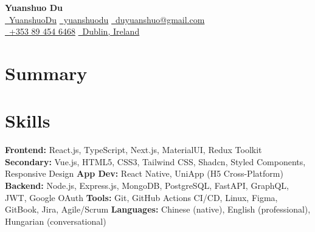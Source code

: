 \documentclass{simpleresume}
\begin{document}
\begin{center}
  {\Large\sffamily\bfseries\color{namecolor} Yuanshuo Du}\\[0.08cm]
  {\sffamily\small
    \href{https://github.com/YuanshuoDu}{\color{accent}\faGithub\color{muted}\ YuanshuoDu}
    \quad\textbullet\quad
    \href{https://linkedin.com/in/yuanshuodu}{\color{accent}\faLinkedin\color{muted}\ yuanshuodu}
    \quad\textbullet\quad
    \href{https://mail.google.com/mail/?view=cm&to=duyuanshuo@gmail.com}{\color{accent}\faEnvelope\color{muted}\ duyuanshuo@gmail.com}
  }\\[0.04cm]
  {\sffamily\small\color{muted}
    \href{tel:+353894546468}{\color{accent}\faPhone\color{muted}\ +353 89 454 6468}
    \quad\textbullet\quad
    \href{https://www.google.com/maps/place/Dublin,+Ireland}{\color{accent}\faMapMarker\ Dublin, Ireland}
  }
\end{center}
\headerrule

\section{Summary}
\vspace{-0.08cm}

\section{Skills}
\noindent
{\sffamily\small\color{secondary}
  \textbf{Frontend:} React.js, TypeScript, Next.js, MaterialUI, Redux Toolkit
  \newline
  \textbf{Secondary:} Vue.js, HTML5, CSS3, Tailwind CSS, Shadcn, Styled Components, Responsive Design
  \newline
  \textbf{App Dev:} React Native, UniApp (H5 Cross-Platform)
  \newline
  \textbf{Backend:} Node.js, Express.js, MongoDB, PostgreSQL, FastAPI, GraphQL, JWT, Google OAuth
  \newline
  \textbf{Tools:} Git, GitHub Actions CI/CD, Linux, Figma, GitBook, Jira, Agile/Scrum
  \newline
  \textbf{Languages:} Chinese (native), English (professional), Hungarian (conversational)
}
\vspace{-0.08cm}
\end{document}

